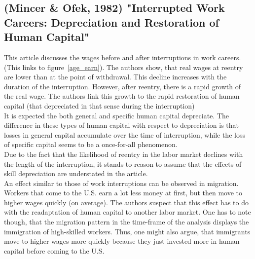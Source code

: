 \documentclass[12pt,a4paper]{article}
\begin{document}
  \subsection{(Mincer \& Ofek, 1982) "Interrupted Work Careers: Depreciation and Restoration of Human Capital"} %
  \label{sub:mincer}
  This article discusses the wages before and after interruptions in work careers. (This links to figure~\ref{age_earn}).
  The authors show, that real wages at reentry are lower than at the point of withdrawal. This decline increases with the
  duration of the interruption. However, after reentry, there is a rapid growth of the real wage. The authors link this 
  growth to the rapid restoration of human capital (that depreciated in that sense during the interruption)\\
  It is expected the both general and specific human capital depreciate. The difference in these types of human capital
  with respect to depreciation is that losses in general capital accumulate over the time of interruption, while
  the loss of specific capital seems to be a once-for-all phenomenon.\\
  Due to the fact that the likelihood of reentry in the labor market declines with the length of the interruption, 
  it stands to reason to assume that the effects of skill depreciation are understated in the article.\\
  An effect similar to those of work interruptions can be observed in migration. Workers that come to the U.S. earn a
  lot less money at first, but then move to higher wages quickly (on average). The authors suspect that this effect
  has to do with the readaptation of human capital to another labor market. One has to note though, that the migration
  pattern in the time-frame of the analysis displays the immigration of high-skilled workers. Thus, one might also
  argue, that immigrants move to higher wages more quickly because they just invested more in human capital before
  coming to the U.S.

\end{document}
